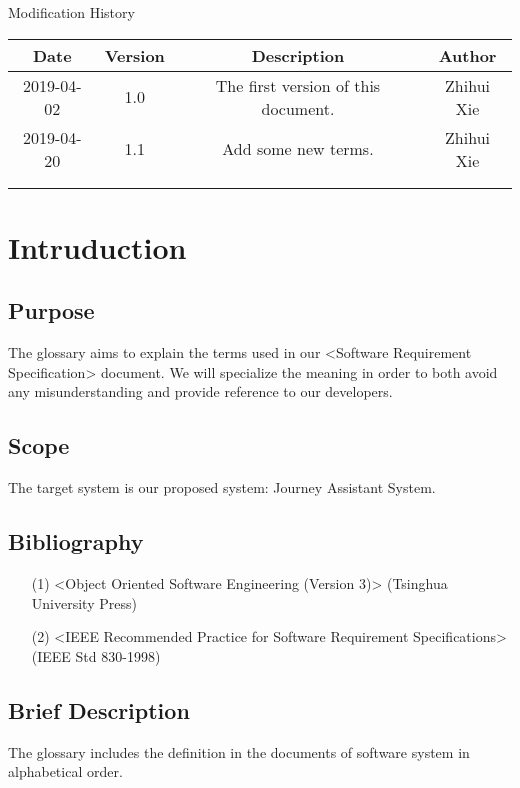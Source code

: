 \documentclass[10pt]{article}
\begin{document}
\newpage

\begin{center}
    {\LARGE Modification History}
    
    \begin{tabular}{|c|c|c|c|} 
        \hline 
        Date&Version&Description&Author\\
        \hline  
        2019-04-02&1.0&The first version of this document.&Zhihui Xie\\
		\hline 
		2019-04-20&1.1&Add some new terms.&Zhihui Xie\\
		\hline
		& & & \\
		\hline
		& & & \\
		\hline
    \end{tabular}    
\end{center}

\newpage

\tableofcontents
\newpage

\section{Intruduction}
\subsection{Purpose}
The glossary aims to explain the terms used in our <Software Requirement Specification> document. We will specialize the meaning in order to both avoid any misunderstanding and provide reference to our developers.

\subsection{Scope}
The target system is our proposed system: Journey Assistant System.

\subsection{Bibliography}
\begin{itemize}
    \item[(1)] <Object Oriented Software Engineering (Version 3)> (Tsinghua University Press)
    \item[(2)] <IEEE Recommended Practice for Software Requirement Specifications> (IEEE Std 830-1998)
\end{itemize}

\subsection{Brief Description}
The glossary includes the definition in the documents of software system in alphabetical order.
\end{document}
